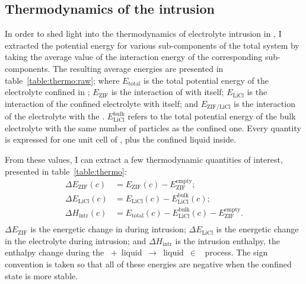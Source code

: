 \documentclass[thesis]{subfiles}
\begin{document}
\subsection{Thermodynamics of the intrusion}

In order to shed light into the thermodynamics of electrolyte intrusion in
, I extracted the potential energy for various sub-components of the total
system by taking the average value of the interaction energy of the
corresponding sub-components. The resulting average energies are presented in
table~\ref{table:thermo:raw}; where $E_\text{total}$ is the total potential
energy of the electrolyte confined in ; $E_\text{ZIF}$ is the interaction
of  with itself; $E_\text{LiCl}$ is the interaction of the confined
electrolyte with itself; and $E_\text{ZIF/LiCl}$ is the interaction of the
electrolyte with the . $E_\text{LiCl}^\text{bulk}$ refers to the total
potential energy of the bulk electrolyte with the same number of particles as
the confined one. Every quantity is expressed for one unit cell of , plus
the confined liquid inside.

From these values, I can extract a few thermodynamic quantities of interest,
presented in table~\ref{table:thermo}:
\[\begin{aligned}
    \Delta E_\text{ZIF} (c)  &= E_\text{ZIF}(c) - E_\text{ZIF}^\text{empty};\\
    \Delta E_\text{LiCl} (c) &= E_\text{LiCl}(c) - E_\text{LiCl}^\text{bulk}(c);\\
    \Delta H_\text{intr} (c) &= E_\text{total}(c) - E_\text{LiCl}^\text{bulk}(c) - E_\text{ZIF}^\text{empty}.\\
\end{aligned}\]
$\Delta E_\text{ZIF}$ is the energetic change in  during intrusion; $\Delta
E_\text{LiCl}$ is the energetic change in the electrolyte during intrusion; and
$\Delta H_\text{intr}$ is the intrusion enthalpy, \emph{\ie} the enthalpy
change during the \mbox{ + liquid $\rightarrow$ liquid $\in$
} process. The sign convention is taken so that all of these energies are
negative when the confined state is more stable.
\end{document}
